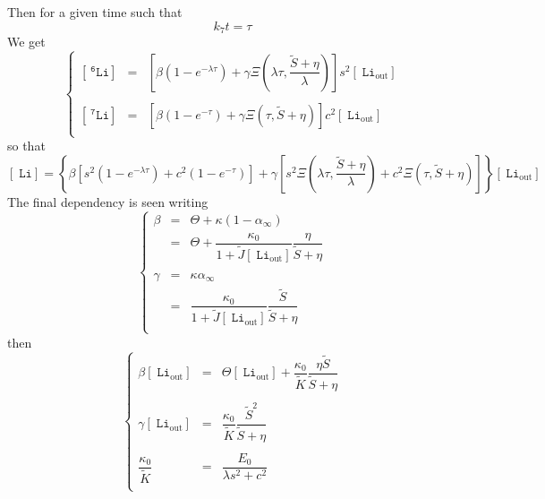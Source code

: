 \documentclass[aps,onecolumn,12pt]{revtex4}
\newcommand{\mychem}[1]{\mathtt{#1}}
\newcommand{\myconc}[1]{\left\lbrack{#1}\right\rbrack}
\newcommand{\spLi}[1]{{~^{\mychem{#1}}\mychem{Li}}}
\newcommand{\Li}[1]{\myconc{\spLi{#1}}}
\newcommand{\spLiOut}[1]{{\spLi{#1}}_{\mathrm{out}}}
\newcommand{\LiOut}[1]{\myconc{\spLiOut{#1}}}
\begin{document}
Then for a given time such that
\begin{equation}
	k_7 t = \tau
\end{equation}
We get
\begin{equation}
\left\lbrace
\begin{array}{rcl}
	\Li{6} & = & \left[ \beta\left(1-e^{-\lambda\tau}\right) + \gamma \Xi\left(\lambda\tau,\dfrac{\tilde{S}+\eta}{\lambda}\right) \right] s^2 \LiOut{} \\
	\\
	\Li{7} & = &  \left[ \beta\left(1-e^{-\tau}\right) + \gamma \Xi\left(\tau,\tilde{S}+\eta\right) \right] c^2 \LiOut{}\\
\end{array}
\right.
\end{equation}
so that
\begin{equation}
	\Li{} = \left\lbrace 
	\beta \left[ s^2 \left(1-e^{-\lambda\tau}\right) + c^2\left(1-e^{-\tau}\right) \right] 
	+ \gamma \left[  s^2 \Xi\left(\lambda\tau,{\dfrac{\tilde{S}+\eta}{\lambda}}\right) + c^2 \Xi\left(\tau,\tilde{S}+\eta\right) \right]
	\right \rbrace \LiOut{}
\end{equation}
The final dependency is seen writing
\begin{equation}
\left\lbrace
	\begin{array}{rcl}
	\beta & = &\Theta + \kappa\left(1-\alpha_\infty\right)\\
	      & = &\Theta + \dfrac{\kappa_0}{1+\tilde{J}\LiOut{}} \dfrac{\eta}{\tilde{S}+\eta}\\
	      \\
	\gamma & = & \kappa \alpha_\infty \\
	       & = & \dfrac{\kappa_0}{1+\tilde{J}\LiOut{}} \dfrac{\tilde{S}}{\tilde{S}+\eta} \\
	\end{array}
\right.
\end{equation}
then
\begin{equation}
\left\lbrace
	\begin{array}{rcl}
	\beta\LiOut{} & = & \Theta \LiOut{} + \dfrac{\kappa_0}{\tilde{K}} \dfrac{\eta\tilde{S}}{\tilde{S}+\eta}\\
	\\
	\gamma\LiOut{} & = & \dfrac{\kappa_0}{\tilde{K}} \dfrac{\tilde{S}^2}{\tilde{S}+\eta}\\
	\\
	\dfrac{\kappa_0}{\tilde{K}} & = & \dfrac{E_0}{\lambda s^2 + c^2}\\
	\end{array}
\right.
\end{equation}
\end{document}
